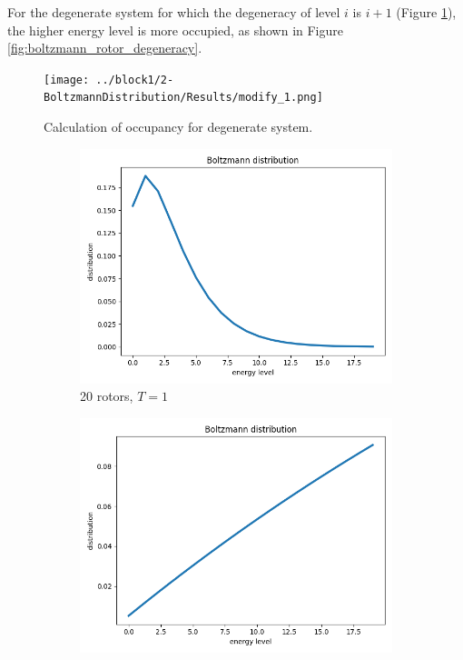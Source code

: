 \documentclass{assignmeownt}
\begin{document}
For the degenerate system for which the degeneracy of level $i$ is $i+1$ (Figure \ref{fig:boltzmann_modify1}), the higher energy level is more occupied, as shown in Figure \ref{fig:boltzmann_rotor_degeneracy}.

\begin{figure}
  \centering
  \texttt{[image: ../block1/2-BoltzmannDistribution/Results/modify\_1.png]}
  \caption{Calculation of occupancy for degenerate system.}
  \label{fig:boltzmann_modify1}
\end{figure}

\begin{figure}
  \centering
  \begin{subfigure}[b]{0.4\textwidth}
      \centering
      \includegraphics[width=\linewidth]{../block1/2-BoltzmannDistribution/Results/degeneracy/20_1.png}
      \caption{20 rotors, $T=1$}
  \end{subfigure}
  \begin{subfigure}[b]{0.4\textwidth}
      \centering
      \includegraphics[width=\linewidth]{../block1/2-BoltzmannDistribution/Results/degeneracy/20_64.png}

\end{subfigure}
\end{figure}
\end{document}

